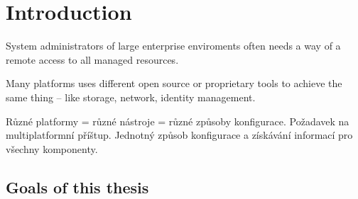 \chapter{Introduction}



System administrators of large enterprise enviroments often needs a way of
a remote access to all managed resources.

Many platforms uses different open source or proprietary tools to achieve the
same thing -- like storage, network, identity management.

Různé platformy = různé nástroje = různé způsoby konfigurace. Požadavek
na multiplatformní příštup. Jednotný způsob konfigurace a získávání informací
pro všechny komponenty.


\section{Goals of this thesis}